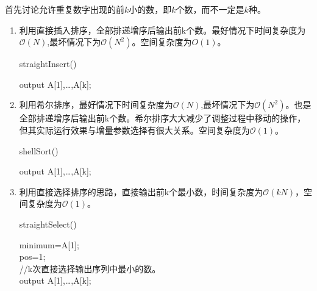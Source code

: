 \documentclass[12pt,a4paper]{article}
\theoremstyle{definition}
\begin{document}
首先讨论允许重复数字出现的前$k$小的数，即$k$个数，而不一定是$k$种。
\begin{enumerate}
	\item 利用直接插入排序，全部排递增序后输出前k个数。最好情况下时间复杂度为$\mathcal{O}(N)$,最坏情况下为$\mathcal{O}(N^2)$。空间复杂度为$O(1)$。
	\begin{center}
		\begin{algorithm}[H]
			\caption{straightInsert()}
			output A[1],\ldots,A[k];
		\end{algorithm}
	\end{center}
	
	
	\item 利用希尔排序，最好情况下时间复杂度为$\mathcal{O}(N)$,最坏情况下为$\mathcal{O}(N^2)$。也是全部排递增序后输出前k个数。希尔排序大大减少了调整过程中移动的操作，但其实际运行效果与增量参数选择有很大关系。空间复杂度为$\mathcal{O}(1)$。
	\begin{center}
		\begin{algorithm}[H]
			\caption{shellSort()}
			output A[1],\ldots,A[k];
		\end{algorithm}
	\end{center}
	

	\item 利用直接选择排序的思路，直接输出前k个最小数，时间复杂度为$\mathcal{O}(kN)$，空间复杂度为$\mathcal{O}(1)$。
	\begin{center}
		\begin{algorithm}[H]
			\caption{straightSelect()}
			minimum=A[1];\\
			pos=1;\\
			//k次直接选择输出序列中最小的数。\\
			output A[1],\ldots,A[k];
		\end{algorithm}
	\end{center}
	

\end{enumerate}
\end{document}
